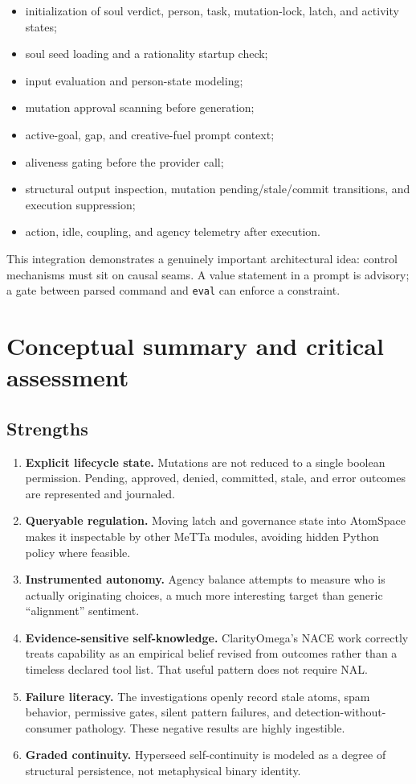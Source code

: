\documentclass[11pt]{article}
\begin{document}
\begin{itemize}
\item initialization of soul verdict, person, task, mutation-lock, latch, and
activity states;
\item soul seed loading and a rationality startup check;
\item input evaluation and person-state modeling;
\item mutation approval scanning before generation;
\item active-goal, gap, and creative-fuel prompt context;
\item aliveness gating before the provider call;
\item structural output inspection, mutation pending/stale/commit transitions,
and execution suppression;
\item action, idle, coupling, and agency telemetry after execution.
\end{itemize}

This integration demonstrates a genuinely important architectural idea: control
mechanisms must sit on causal seams.  A value statement in a prompt is advisory;
a gate between parsed command and \texttt{eval} can enforce a constraint.

\section{Conceptual summary and critical assessment}

\subsection{Strengths}

\begin{enumerate}
\item \textbf{Explicit lifecycle state.}  Mutations are not reduced to a
single boolean permission.  Pending, approved, denied, committed, stale, and
error outcomes are represented and journaled.
\item \textbf{Queryable regulation.}  Moving latch and governance state into
AtomSpace makes it inspectable by other MeTTa modules, avoiding hidden Python
policy where feasible.
\item \textbf{Instrumented autonomy.}  Agency balance attempts to measure who
is actually originating choices, a much more interesting target than generic
``alignment'' sentiment.
\item \textbf{Evidence-sensitive self-knowledge.}  ClarityOmega's NACE work
correctly treats capability as an empirical belief revised from outcomes rather
than a timeless declared tool list.  That useful pattern does not require NAL.
\item \textbf{Failure literacy.}  The investigations openly record stale
atoms, spam behavior, permissive gates, silent pattern failures, and
detection-without-consumer pathology.  These negative results are highly
ingestible.
\item \textbf{Graded continuity.}  Hyperseed self-continuity is modeled as a
degree of structural persistence, not metaphysical binary identity.
\end{enumerate}
\end{document}

